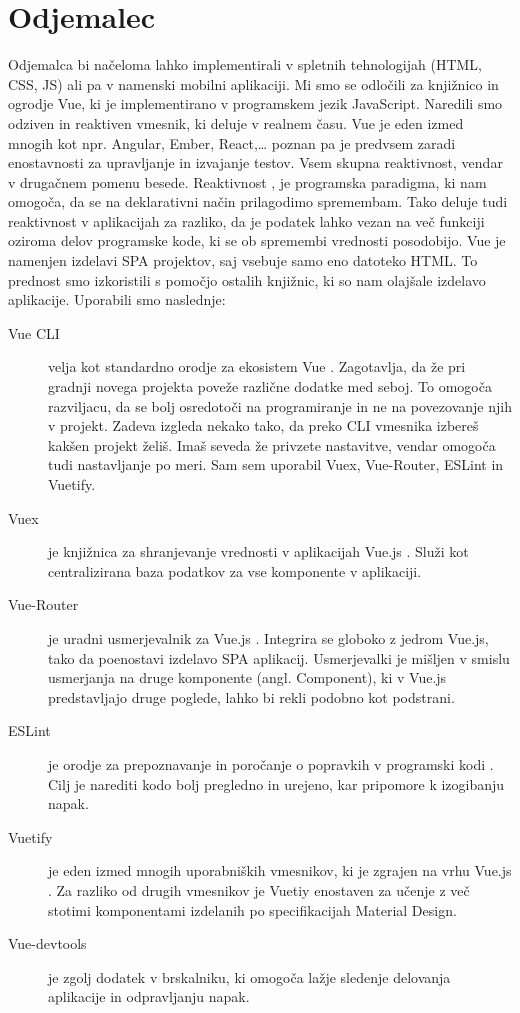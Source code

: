 \documentclass[a4paper, 12pt]{book}
\begin{document}
\section{Odjemalec}

Odjemalca bi načeloma lahko implementirali v spletnih tehnologijah (HTML, CSS, JS) ali pa v namenski mobilni aplikaciji. Mi smo se odločili za knjižnico in ogrodje Vue, ki je implementirano v programskem jezik JavaScript.  Naredili smo odziven in reaktiven vmesnik, ki deluje v realnem času. Vue je eden izmed mnogih kot npr. Angular, Ember, React,… poznan pa je predvsem zaradi enostavnosti za upravljanje in izvajanje testov. Vsem skupna reaktivnost, vendar v drugačnem pomenu besede. Reaktivnost \cite{reaktivnost}, je programska paradigma, ki nam omogoča, da se na deklarativni način prilagodimo spremembam. Tako deluje tudi reaktivnost v aplikacijah za razliko, da je podatek lahko vezan na več funkciji oziroma delov programske kode, ki se ob spremembi vrednosti posodobijo. Vue je namenjen izdelavi SPA projektov, saj vsebuje samo eno datoteko HTML. To prednost smo izkoristili s pomočjo ostalih knjižnic, ki so nam olajšale izdelavo aplikacije. Uporabili smo naslednje:
\begin{description}
\item[Vue CLI] velja kot standardno orodje za ekosistem Vue \cite{VueCLI}. Zagotavlja, da že pri gradnji novega projekta poveže različne dodatke med seboj. To omogoča razviljacu, da se bolj osredotoči na programiranje in ne na povezovanje njih v projekt. Zadeva izgleda nekako tako, da preko CLI vmesnika izbereš kakšen projekt želiš. Imaš seveda že privzete nastavitve, vendar omogoča tudi nastavljanje po meri. Sam sem uporabil Vuex, Vue-Router, ESLint in Vuetify.
\item[Vuex] je knjižnica za shranjevanje vrednosti v aplikacijah Vue.js \cite{Vuex}. Služi kot centralizirana baza podatkov za vse komponente v aplikaciji. 
\item[Vue-Router] je uradni usmerjevalnik za Vue.js \cite{VueRouter}. Integrira se globoko z jedrom Vue.js, tako da poenostavi izdelavo SPA aplikacij. Usmerjevalki je mišljen v smislu usmerjanja na druge komponente (angl. Component), ki v Vue.js predstavljajo druge poglede, lahko bi rekli podobno kot podstrani.
\item[ESLint] je orodje za prepoznavanje in poročanje o popravkih v programski kodi \cite{ESLint}. Cilj je narediti kodo bolj pregledno in urejeno, kar pripomore k izogibanju napak.
\item[Vuetify] je eden izmed mnogih uporabniških vmesnikov, ki je zgrajen na vrhu Vue.js \cite{Vuetify}. Za razliko od drugih vmesnikov je Vuetiy enostaven za učenje z več stotimi komponentami izdelanih po specifikacijah Material Design.
\item[Vue-devtools] je zgolj dodatek v brskalniku, ki omogoča lažje sledenje delovanja aplikacije in odpravljanju napak. 

\end{description}
\end{document}
